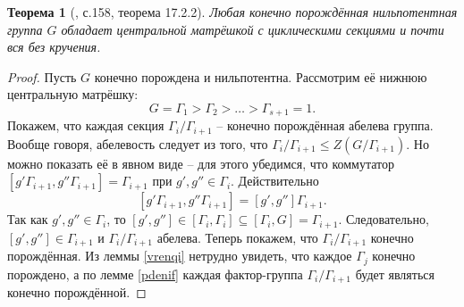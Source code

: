 \documentclass{article}
\newtheorem{theorem}{Теорема}[section]
\begin{document}
\begin{theorem}[\cite{kargapolov}, с.158, теорема 17.2.2] \label{equinor}
    Любая конечно порождённая нильпотентная группа $G$ обладает центральной матрёшкой с циклическими секциями и почти вся без кручения.
\end{theorem}
\begin{proof}
    Пусть $G$ конечно порождена и нильпотентна. Рассмотрим её нижнюю центральную матрёшку:
    \[
        G = \Gamma_1 > \Gamma_2 > \ldots > \Gamma_{s + 1} = 1.
    \]
    Покажем, что каждая секция $\Gamma_i / \Gamma_{i + 1}$ -- конечно порождённая абелева группа. Вообще говоря, абелевость следует из того, что $\Gamma_i / \Gamma_{i + 1} \leqslant Z(G / \Gamma_{i + 1})$. Но можно показать её в явном виде -- для этого убедимся, что коммутатор $[g' \Gamma_{i + 1}, g'' \Gamma_{i + 1}] = \Gamma_{i + 1}$ при $g', g'' \in \Gamma_i$. Действительно
    \[
        [g' \Gamma_{i + 1}, g'' \Gamma_{i + 1}] = [g', g''] \Gamma_{i + 1}.
    \]
    Так как $g', g'' \in \Gamma_i$, то $[g', g''] \in [\Gamma_i, \Gamma_i] \subseteq [\Gamma_i, G] = \Gamma_{i + 1}$. Следовательно, $[g', g''] \in \Gamma_{i + 1}$ и $\Gamma_i / \Gamma_{i + 1}$ абелева.
    Теперь покажем, что $\Gamma_i / \Gamma_{i + 1}$ конечно порождённая. Из леммы \ref{vrenqi} нетрудно увидеть, что каждое $\Gamma_j$ конечно порождено, а по лемме \ref{pdenif} каждая фактор-группа $\Gamma_i / \Gamma_{i + 1}$ будет являться конечно порождённой.
    

\end{proof}
\end{document}
